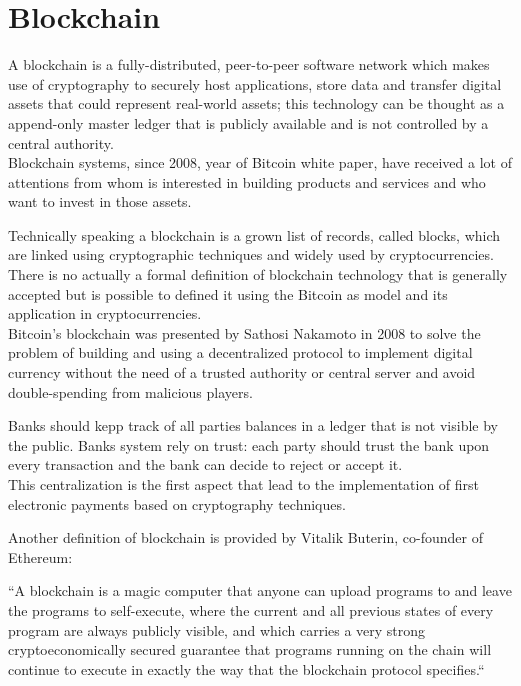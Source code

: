 \chapter{Blockchain}

A blockchain is a fully-distributed, peer-to-peer software network which makes use of cryptography to securely host applications, store data and transfer digital assets that could represent real-world assets; this technology can be thought as a append-only master ledger that is publicly available and is not controlled by a central authority.\\

Blockchain systems, since 2008, year of Bitcoin white paper, have received a lot of attentions from whom is interested in building products and services and who want to invest in those assets.

Technically speaking a blockchain is a grown list of records, called blocks, which are linked using cryptographic techniques and widely used by cryptocurrencies.\\
There is no actually a formal definition of blockchain technology that is generally accepted but is possible to defined it using the Bitcoin as model and its application in cryptocurrencies.\\

Bitcoin's blockchain was presented by Sathosi Nakamoto in 2008 to solve the problem of building and using a decentralized protocol to implement digital currency without the need of a trusted authority or central server and avoid double-spending from malicious players. 

Banks should kepp track of all parties balances in a ledger that is not visible by the public. Banks system rely on trust: each party should trust the bank upon every transaction and the bank can decide to reject or accept it.\\
This centralization is the first aspect that lead to the implementation of first electronic payments based on cryptography techniques.

Another definition of blockchain is provided by Vitalik Buterin, co-founder of Ethereum:\newline

``A blockchain is a magic computer that anyone can upload programs to and leave the programs to self-execute, where the current and all previous states of every program are always publicly visible, and which carries a very strong cryptoeconomically secured guarantee that programs running on the chain will continue to execute in exactly the way that the blockchain protocol specifies.``\\

